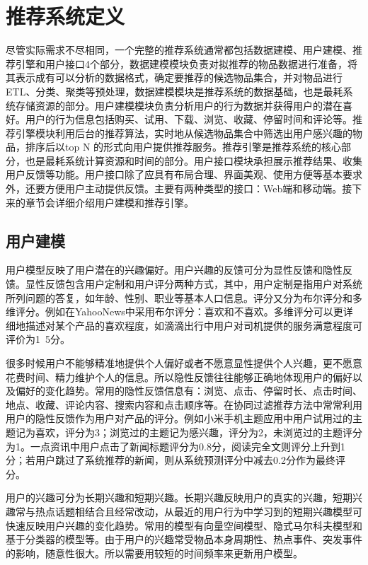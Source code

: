 \section{推荐系统定义}
尽管实际需求不尽相同，一个完整的推荐系统通常都包括数据建模、用户建模、推荐引擎和用户接口4个部分，数据建模模块负责对拟推荐的物品数据进行准备，将其表示成有可以分析的数据格式，确定要推荐的候选物品集合，并对物品进行ETL、分类、聚类等预处理，数据建模模块是推荐系统的数据基础，也是最耗系统存储资源的部分。用户建模模块负责分析用户的行为数据并获得用户的潜在喜好。用户的行为信息包括购买、试用、下载、浏览、收藏、停留时间和评论等。推荐引擎模块利用后台的推荐算法，实时地从候选物品集合中筛选出用户感兴趣的物品，排序后以top N 的形式向用户提供推荐服务。推荐引擎是推荐系统的核心部分，也是最耗系统计算资源和时间的部分。用户接口模块承担展示推荐结果、收集用户反馈等功能。用户接口除了应具有布局合理、界面美观、使用方便等基本要求外，还要方便用户主动提供反馈。主要有两种类型的接口：Web端和移动端。接下来的章节会详细介绍用户建模和推荐引擎。
	\subsection{用户建模}
	用户模型反映了用户潜在的兴趣偏好。用户兴趣的反馈可分为显性反馈和隐性反馈。显性反馈包含用户定制和用户评分两种方式，其中，用户定制是指用户对系统所列问题的答复，如年龄、性别、职业等基本人口信息。评分又分为布尔评分和多维评分。例如在YahooNews中采用布尔评分：喜欢和不喜欢。多维评分可以更详细地描述对某个产品的喜欢程度，如滴滴出行中用户对司机提供的服务满意程度可评价为1~5分。

	很多时候用户不能够精准地提供个人偏好或者不愿意显性提供个人兴趣，更不愿意花费时间、精力维护个人的信息。所以隐性反馈往往能够正确地体现用户的偏好以及偏好的变化趋势。常用的隐性反馈信息有：浏览、点击、停留时长、点击时间、地点、收藏、评论内容、搜索内容和点击顺序等。在协同过滤推荐方法中常常利用用户的隐性反馈作为用户对产品的评分。例如小米手机主题应用中用户试用过的主题记为喜欢，评分为3；浏览过的主题记为感兴趣，评分为2，未浏览过的主题评分为1。一点资讯中用户点击了新闻标题评分为0.8分，阅读完全文则评分上升到1分；若用户跳过了系统推荐的新闻，则从系统预测评分中减去0.2分作为最终评分。

	用户的兴趣可分为长期兴趣和短期兴趣。长期兴趣反映用户的真实的兴趣，短期兴趣常与热点话题相结合且经常改动，从最近的用户行为中学习到的短期兴趣模型可快速反映用户兴趣的变化趋势。常用的模型有向量空间模型、隐式马尔科夫模型和基于分类器的模型等。由于用户的兴趣常受物品本身周期性、热点事件、突发事件的影响，随意性很大。所以需要用较短的时间频率来更新用户模型。

